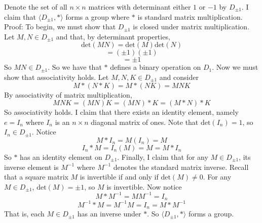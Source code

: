 \documentclass{article}
\begin{document}
Denote the set of all $n \times n$ matrices with determinant either $1$ or $-1$ by $D_{\pm 1}$. I claim that $\langle D_{\pm 1}, * \rangle$ forms a group where $*$ is standard matrix multiplication.
\newline
Proof: To begin, we must show that $D_{\pm 1}$ is closed under matrix multiplication. Let $M, N \in D_{\pm 1}$ and that, by determinant properties,  
\[\text{det}(MN) = \text{det}(M) \text{det}(N)\]
\[ = (\pm 1) (\pm 1)\]
\[ = \pm 1\]
So $MN \in D_{\pm 1}$. So we have that $*$ defines a binary operation on $D_1$. Now we must show that associativity holds.
Let $M, N, K \in D_{\pm 1}$ and consider
\[M * (N * K) = M * (NK) = MNK\]
By associativity of matrix multiplication,
\[MNK = (MN)K = (MN) * K = (M * N) * K\]
So associativity holds.
\newline
I claim that there exists an identity element, namely $e = I_n$ where $I_n$ is an $n \times n$ diagonal matrix of ones. Note that $\text{det}(I_n) = 1$, so $I_n \in D_{\pm 1}$. Notice
\[M * I_n = M(I_n) = M\]
\[I_n * M = I_n(M) = M = M * I_n\]
So $*$ has an identity element on $D_{\pm 1}$. Finally, I claim that for any $M \in D_{\pm 1}$, its inverse element is $M^{-1}$ where $M^{-1}$ denotes the standard matrix inverse. Recall that a square matrix $M$ is invertible if and only if $\text{det}(M) \neq 0$. For any $M \in D_{\pm 1}$, $\text{det}(M) = \pm 1$, so $M$ is invertible. Now notice
\[M * M^{-1} = MM^{-1} = I_n\]
\[M^{-1} * M = M^{-1}M = I_n = M * M^{-1}\]
That is, each $M \in D_{\pm 1}$ has an inverse under $*$. So $\langle D_{\pm 1}, * \rangle$ forms a group.
\end{document}
